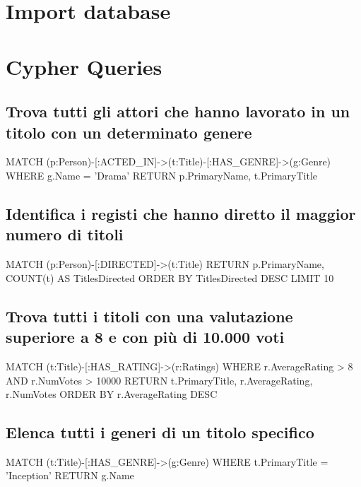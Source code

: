 \documentclass[a4paper,12pt]{article}
\begin{document}
%    

\section{Import database}

\section{Cypher Queries}
\subsection{Trova tutti gli attori che hanno lavorato in un titolo con un determinato genere}
MATCH (p:Person)-[:ACTED_IN]->(t:Title)-[:HAS_GENRE]->(g:Genre)
WHERE g.Name = 'Drama'
RETURN p.PrimaryName, t.PrimaryTitle

\subsection{Identifica i registi che hanno diretto il maggior numero di titoli}
MATCH (p:Person)-[:DIRECTED]->(t:Title)
RETURN p.PrimaryName, COUNT(t) AS TitlesDirected
ORDER BY TitlesDirected DESC
LIMIT 10

\subsection{Trova tutti i titoli con una valutazione superiore a 8 e con più di 10.000 voti}
MATCH (t:Title)-[:HAS_RATING]->(r:Ratings)
WHERE r.AverageRating > 8 AND r.NumVotes > 10000
RETURN t.PrimaryTitle, r.AverageRating, r.NumVotes
ORDER BY r.AverageRating DESC

\subsection{Elenca tutti i generi di un titolo specifico}
MATCH (t:Title)-[:HAS_GENRE]->(g:Genre)
WHERE t.PrimaryTitle = 'Inception'
RETURN g.Name
\end{document}
